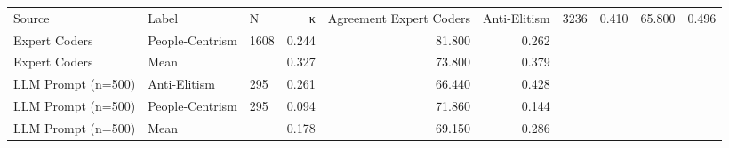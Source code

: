 \begin{tabular}{lllrrr}
\toprule
Source & Label & N & κ & Agreement %
\midrule
Expert Coders & Anti-Elitism & 3236 & 0.410 & 65.800 & 0.496 \\
Expert Coders & People-Centrism & 1608 & 0.244 & 81.800 & 0.262 \\
Expert Coders & Mean &  & 0.327 & 73.800 & 0.379 \\
LLM Prompt (n=500) & Anti-Elitism & 295 & 0.261 & 66.440 & 0.428 \\
LLM Prompt (n=500) & People-Centrism & 295 & 0.094 & 71.860 & 0.144 \\
LLM Prompt (n=500) & Mean &  & 0.178 & 69.150 & 0.286 \\
\bottomrule
\end{tabular}
